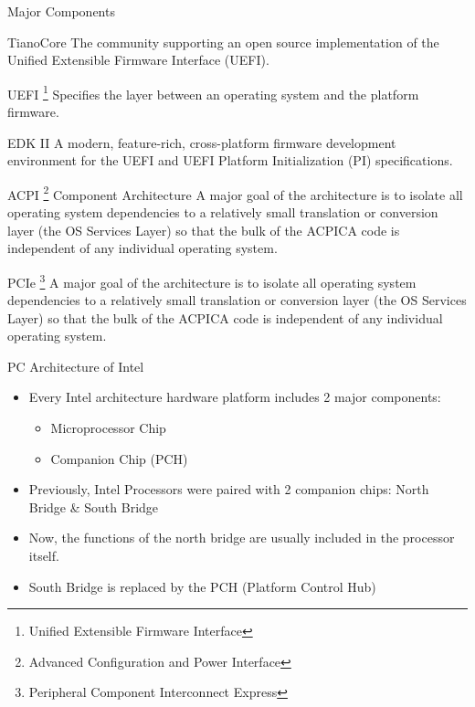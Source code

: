 \begin{frame}[allowframebreaks]{Major Components}
    \begin{redblock}{TianoCore}
        The community supporting an open source implementation of the Unified Extensible Firmware Interface (UEFI).
    \end{redblock}
    
    \begin{greenblock}{UEFI \footnote{Unified Extensible Firmware Interface}}
        Specifies the layer between an operating system and the platform firmware.
    \end{greenblock}
    
    \begin{blueblock}{EDK II}
    A modern, feature-rich, cross-platform firmware development environment for the UEFI and UEFI Platform Initialization (PI) specifications.
    \end{blueblock}

    \begin{redblock}{ACPI \footnote{Advanced Configuration and Power Interface} Component Architecture}
        A major goal of the architecture is to isolate all operating system dependencies to a relatively small translation or conversion layer (the OS Services Layer) so that the bulk of the ACPICA code is independent of any individual operating system.
    \end{redblock}


    \begin{greenblock}{PCIe \footnote{Peripheral Component Interconnect Express}}
        A major goal of the architecture is to isolate all operating system dependencies to a relatively small translation or conversion layer (the OS Services Layer) so that the bulk of the ACPICA code is independent of any individual operating system.
    \end{greenblock}

\end{frame}

\begin{frame}{PC Architecture of Intel}
    \begin{itemize}
        \item Every Intel architecture hardware platform includes 2 major components:
            \begin{itemize}
                \item Microprocessor Chip
                \item Companion Chip (PCH) 
            \end{itemize}
        \item Previously, Intel Processors were paired with 2 companion chips: North Bridge \& South Bridge
        \item Now, the functions of the north bridge are usually included in the processor itself.
        \item South Bridge is replaced by the PCH (Platform Control Hub)
    \end{itemize}
\end{frame}
